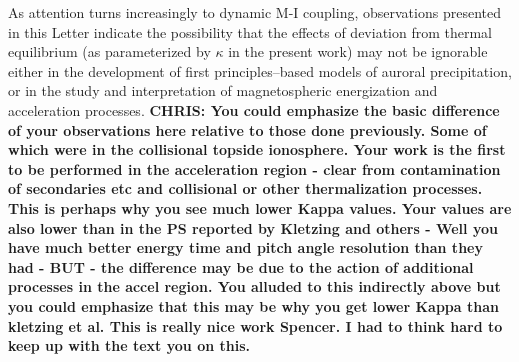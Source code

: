   As attention turns increasingly to dynamic M-I coupling, observations
  presented in this Letter indicate the possibility that the effects of
  deviation from thermal equilibrium (as parameterized by $\kappa$ in the
  present work) may not be ignorable either in the development of first
  principles--based models of auroral precipitation, or in the study and
  interpretation of magnetospheric energization and acceleration
  processes. \textbf{CHRIS: You could emphasize the basic difference of your
    observations here relative to those done previously. Some of which were in
    the collisional topside ionosphere. Your work is the first to be performed
    in the acceleration region - clear from contamination of secondaries etc and
    collisional or other thermalization processes. This is perhaps why you see
    much lower Kappa values.  Your values are also lower than in the PS reported
    by Kletzing and others - Well you have much better energy time and pitch
    angle resolution than they had - BUT - the difference may be due to the
    action of additional processes in the accel region. You alluded to this
    indirectly above but you could emphasize that this may be why you get lower
    Kappa than kletzing et al.  This is really nice work Spencer. I had to think
    hard to keep up with the text you on this. }

  



